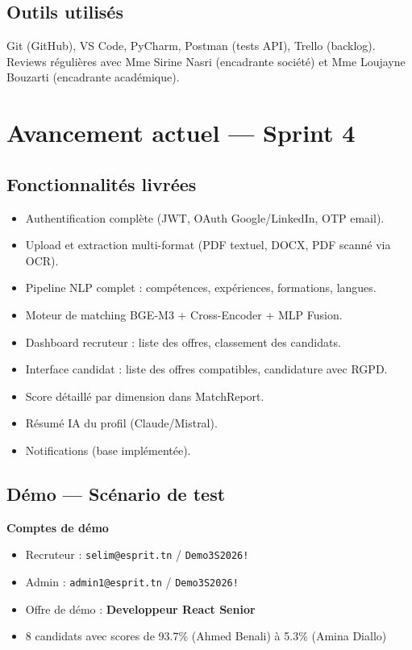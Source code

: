 \documentclass[12pt,a4paper]{report}
\newenvironment{infobox}[1][]{%
  \begin{framed}\noindent\textbf{\textcolor{navyblue}{#1}}\\[2pt]%
}{\end{framed}}
\begin{document}
\section{Outils utilisés}

Git (GitHub), VS Code, PyCharm, Postman (tests API), Trello (backlog).
Reviews régulières avec Mme Sirine Nasri (encadrante société) et
Mme Loujayne Bouzarti (encadrante académique).

\chapter{Avancement actuel — Sprint 4}

\section{Fonctionnalités livrées}

\begin{itemize}
  \item[\checkmark] Authentification complète (JWT, OAuth Google/LinkedIn, OTP email).
  \item[\checkmark] Upload et extraction multi-format (PDF textuel, DOCX, PDF scanné via OCR).
  \item[\checkmark] Pipeline NLP complet : compétences, expériences, formations, langues.
  \item[\checkmark] Moteur de matching BGE-M3 + Cross-Encoder + MLP Fusion.
  \item[\checkmark] Dashboard recruteur : liste des offres, classement des candidats.
  \item[\checkmark] Interface candidat : liste des offres compatibles, candidature avec RGPD.
  \item[\checkmark] Score détaillé par dimension dans MatchReport.
  \item[\checkmark] Résumé IA du profil (Claude/Mistral).
  \item[\checkmark] Notifications (base implémentée).
\end{itemize}

\section{Démo — Scénario de test}

\begin{infobox}[Comptes de démo]
\begin{itemize}
  \item Recruteur : \texttt{selim@esprit.tn} / \texttt{Demo3S2026!}
  \item Admin : \texttt{admin1@esprit.tn} / \texttt{Demo3S2026!}
  \item Offre de démo : \textbf{Developpeur React Senior}
  \item 8 candidats avec scores de 93.7\% (Ahmed Benali) à 5.3\% (Amina Diallo)
\end{itemize}
\end{infobox}
\end{document}
